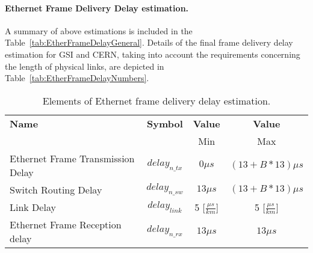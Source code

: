 \paragraph{Ethernet Frame Delivery Delay estimation.}

A summary of above estimations is included in the
Table~\ref{tab:EtherFrameDelayGeneral}. Details of the final frame delivery
delay estimation for GSI and CERN, taking into account the requirements
concerning the length of physical links, are depicted in
Table~\ref{tab:EtherFrameDelayNumbers}.

\newpage

\begin{table}[ht]
\caption{Elements of Ethernet frame delivery delay estimation.} 
\centering
	\begin{tabular}{| l |  c | c | c |}          \hline
\textbf{Name}&\textbf{Symbol}&\textbf{Value}&\textbf{Value}                  \\
                                 &                &  Min& Max          \\ \hline
Ethernet Frame Transmission Delay&$delay_{n\_tx}$&$0\mu s$&$(13 + B * 13)\mu s$
\\ \hline
Switch Routing Delay            &$delay_{n\_sw}$&$13\mu s$&$(13 + B * 13)\mu s$ 
 
\\ \hline
Link Delay                       & $delay_{link}$ &5 [$\frac{\mu
s}{km}$]&5 [$\frac{\mu s}{km}$]      
\\ \hline
Ethernet Frame Reception delay   & $delay_{n\_rx}$&$13\mu s$&$13\mu s$

\\ \hline
\end{tabular}
\label{app:tab:EtherFrameDelayGeneral}
\end{table}

